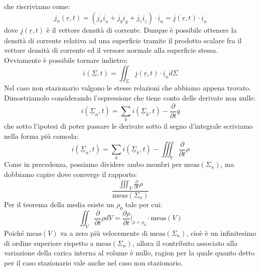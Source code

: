 \documentclass{book}
\begin{document}
        che riscriviamo come:
        \begin{equation}
            j_{n}(\underline{r},t) = (j_{x}\underline{i}_{x}+j_{y}\underline{i}_{y}+j_{z}\underline{i}_{z}) \cdot \underline{i}_{n} = \underline{j}(\underline{r},t) \cdot \underline{i}_{n}
        \end{equation}
        dove $\underline{j}(\underline{r},t)$ è il vettore densità di corrente. Dunque è possibile ottenere la densità di corrente relativa ad una superficie tramite il prodotto scalare fra il vettore densità di corrente ed il versore normale alla superficie stessa.\\
        Ovviamente è possibile tornare indietro:
        \begin{equation}
            i(\underline{\Sigma}, t) = \iint_{\Sigma} \underline{j} (\underline{r},t) \cdot \underline{i}_{n} d \Sigma
         \end{equation}
         Nel caso non stazionario valgono le stesse relazioni che abbiamo appena trovato. Dimostriamolo considerando l'espressione che tiene conto delle derivate non nulle:
         \begin{equation}
             i(\underline{\Sigma}_{n}, t) = \sum_{k} i(\underline{\Sigma}_{k},t) - \frac{\partial}{\partial t}q
         \end{equation}
         che sotto l'ipotesi di poter passare le derivate sotto il segno d'integrale scriviamo nella forma più comoda:
         \begin{equation}
             i(\underline{\Sigma}_{n}, t) = \sum_{k} i(\underline{\Sigma}_{k},t) - \iiint_{V} \frac{\partial}{\partial t}\rho
         \end{equation}
        Come in precedenza, possiamo dividere ambo membri per $\textrm{meas}(\Sigma_{n})$, ma dobbiamo capire dove converge il rapporto:
        \begin{equation}
            \frac{\displaystyle\iiint_{V} \frac{\partial}{\partial t}\rho}{\textrm{meas}(\Sigma_{n})}
        \end{equation}
        Per il teorema della media esiste un $\rho_{0}$ tale per cui:
        \begin{equation}
            \iint_{V} \frac{\partial}{\partial t} \rho dV = \frac{\partial \rho}{\partial t} |_{\rho = \rho_{0}} \cdot \textrm{meas}(V)
        \end{equation}
        Poiché $\textrm{meas}(V)$ va a zero più velocemente di $\textrm{meas}(\Sigma_{n})$, cioè è un infinitesimo di ordine superiore rispetto a $\textrm{meas}(\Sigma_{n})$, allora il contributo associato alla variazione della carica interna al volume è nullo, ragion per la quale quanto detto per il caso stazionario vale anche nel caso non stazionario. \\ \\
\end{document}
